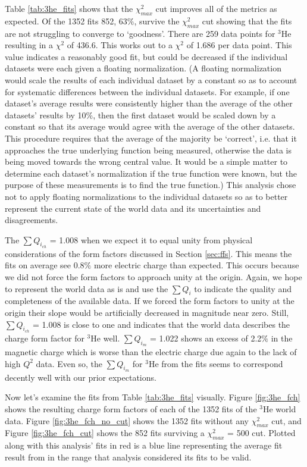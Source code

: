 Table \ref{tab:3he_fits} shows that the $\chi^2_{max}$ cut improves all of the metrics as expected. Of the 1352 fits 852, 63$\%$, survive the $\chi^2_{max}$ cut showing that the fits are not struggling to converge to `goodness'. There are 259 data points for $^3$He resulting in a $\chi^2$ of 436.6. This works out to a $\chi^2$ of 1.686 per data point. This value indicates a reasonably good fit, but could be decreased if the individual datasets were each given a floating normalization. (A floating normalization would scale the results of each individual dataset by a constant so as to account for systematic differences between the individual datasets. For example, if one dataset's average results were consistently higher than the average of the other datasets' results by 10$\%$, then the first dataset would be scaled down by a constant so that its average would agree with the average of the other datasets. This procedure requires that the average of the majority be `correct', i.e. that it approaches the true underlying function being measured, otherwise the data is being moved towards the wrong central value. It would be a simple matter to determine each dataset's normalization if the true function were known, but the purpose of these measurements is to find the true function.) This analysis chose not to apply floating normalizations to the individual datasets so as to better represent the current state of the world data and its uncertainties and disagreements.%

The $\sum Q_{i_{ch}}$ = 1.008 when we expect it to equal unity from physical considerations of the form factors discussed in Section \ref{sec:ffs}. This means the fits on average see 0.8$\%$ more electric charge than expected. This occurs because we did not force the form factors to approach unity at the origin. Again, we hope to represent the world data as is and use the $\sum Q_{i}$ to indicate the quality and completeness of the available data. If we forced the form factors to unity at the origin their slope would be artificially decreased in magnitude near zero. Still, $\sum Q_{i_{ch}}$ = 1.008 is close to one and indicates that the world data describes the charge form factor for $^3$He well. $\sum Q_{i_{m}}$ = 1.022 shows an excess of 2.2$\%$ in the magnetic charge which is worse than the electric charge due again to the lack of high $Q^2$ data. Even so, the $\sum Q_{i_{m}}$ for $^3$He from the fits seems to correspond decently well with our prior expectations. %

Now let's examine the fits from Table \ref{tab:3he_fits} visually. Figure \ref{fig:3he_fch} shows the resulting charge form factors of each of the 1352 fits of the $^3$He world data. Figure \ref{fig:3he_fch_no_cut} shows the 1352 fits without any $\chi^2_{max}$ cut, and Figure \ref{fig:3he_fch_cut} shows the 852 fits surviving a $\chi^2_{max}$ = 500 cut. Plotted along with this analysis' fits in red is a blue line representing the average fit result from \cite{Article:Amroun} in the range that analysis considered its fits to be valid. 

